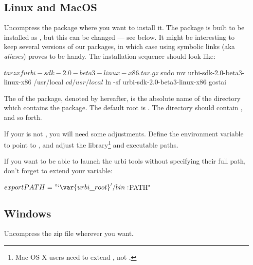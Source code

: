 \subsection{Linux and MacOS}

Uncompress the package where you want to install it.  The package is
built to be installed as , but this can be
changed --- see below.  It might be interesting to keep several
versions of our packages, in which case using symbolic links (aka
\emph{aliases}) proves to be handy.  The installation sequence should
look like:

\begin{shell}
$ tar zxf urbi-sdk-2.0-beta3-linux-x86.tar.gz
$ sudo mv urbi-sdk-2.0-beta3-linux-x86 /usr/local
$ cd /usr/local
$ ln -sf urbi-sdk-2.0-beta3-linux-x86 gostai
\end{shell}

The  of the package, denoted by  hereafter,
is the absolute name of the directory which contains the package.  The
default root is .  The directory
 should contain ,  and so forth.

If your  is not , you will need
some adjustments.  Define the environment variable  to point to
, and adjust the library\footnote{%
  Mac OS X users need to extend , not
  .
} and executable paths.


If you want to be able to launch the urbi tools without specifying
their full path, don't forget to extend your  variable:

\begin{shell}[escapeinside=`']
$ export PATH="`'/bin:$PATH"
\end{shell}%

\subsection{Windows}

Uncompress the zip file wherever you want.


